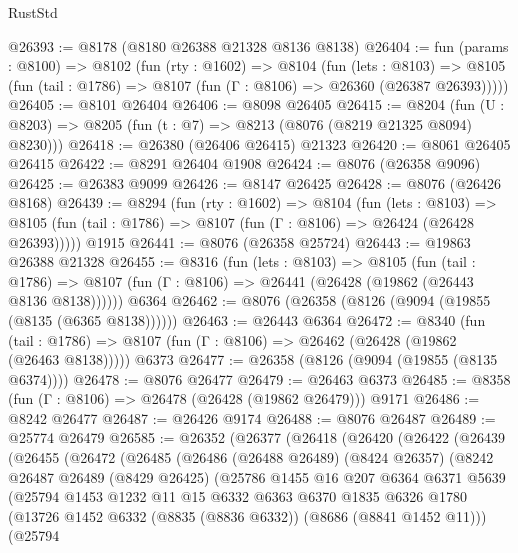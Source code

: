 \begin{lexlean}{RustStd}
\begin{coremodule}
@26393 := @8178 (@8180 @26388 @21328 @8136 @8138)
@26404 := fun (params : @8100) =>
  @8102
    (fun (rty : @1602) =>
    @8104
      (fun (lets : @8103) =>
      @8105 (fun (tail : @1786) => @8107 (fun (Γ : @8106) => @26360 (@26387 @26393)))))
@26405 := @8101 @26404
@26406 := @8098 @26405
@26415 := @8204
    (fun (U : @8203) => @8205 (fun (t : @7) => @8213 (@8076 (@8219 @21325 @8094) @8230)))
@26418 := @26380 (@26406 @26415) @21323
@26420 := @8061 @26405 @26415
@26422 := @8291 @26404 @1908
@26424 := @8076 (@26358 @9096)
@26425 := @26383 @9099
@26426 := @8147 @26425
@26428 := @8076 (@26426 @8168)
@26439 := @8294
    (fun (rty : @1602) =>
    @8104
      (fun (lets : @8103) =>
      @8105 (fun (tail : @1786) => @8107 (fun (Γ : @8106) => @26424 (@26428 @26393)))))
    @1915
@26441 := @8076 (@26358 @25724)
@26443 := @19863 @26388 @21328
@26455 := @8316
    (fun (lets : @8103) =>
    @8105
      (fun (tail : @1786) =>
      @8107 (fun (Γ : @8106) => @26441 (@26428 (@19862 (@26443 @8136 @8138))))))
    @6364
@26462 := @8076 (@26358 (@8126 (@9094 (@19855 (@8135 (@6365 @8138))))))
@26463 := @26443 @6364
@26472 := @8340
    (fun (tail : @1786) => @8107 (fun (Γ : @8106) => @26462 (@26428 (@19862 (@26463 @8138)))))
    @6373
@26477 := @26358 (@8126 (@9094 (@19855 (@8135 @6374))))
@26478 := @8076 @26477
@26479 := @26463 @6373
@26485 := @8358 (fun (Γ : @8106) => @26478 (@26428 (@19862 @26479))) @9171
@26486 := @8242 @26477
@26487 := @26426 @9174
@26488 := @8076 @26487
@26489 := @25774 @26479
@26585 := @26352
    (@26377
      (@26418
        (@26420
          (@26422
            (@26439
              (@26455
                (@26472
                  (@26485
                    (@26486
                      (@26488 @26489)
                      (@8424 @26357)
                      (@8242
                        @26487
                        @26489
                        (@8429 @26425)
                        (@25786
                          @1455
                          @16
                          @207
                          @6364
                          @6371
                          @5639
                          (@25794
                            @1453
                            @1232
                            @11
                            @15
                            @6332
                            @6363
                            @6370
                            @1835
                            @6326
                            @1780
                            (@13726 @1452 @6332 (@8835 (@8836 @6332)) (@8686 (@8841 @1452 @11)))
                            (@25794

\end{coremodule}
\end{lexlean}
